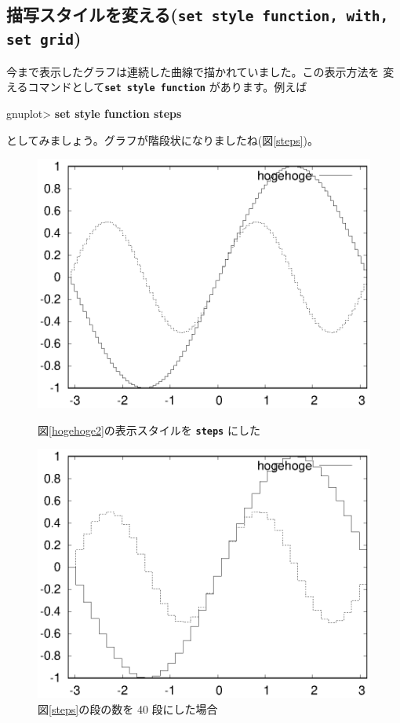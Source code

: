 \documentclass[a4j]{ujarticle} %
\newenvironment{terminal}{%
  \begin{center}
   \begin{minipage}{.8\textwidth}
    \setlength{\FrameSep}{.5\FrameSep}%
    \begin{framed}\ttfamily\small%
     \setlength\baselineskip{.85\baselineskip}%
}{%
    \end{framed}
   \end{minipage}
  \end{center}%
}
\begin{document}
\subsection{描写スタイルを変える({\tt\bf set style function, with, set grid})}
今まで表示したグラフは連続した曲線で描かれていました。この表示方法を
変えるコマンドとして{\tt\bf set style function} があります。例えば
\begin{terminal}
gnuplot> {\bf set style function steps}
\end{terminal}
としてみましょう。グラフが階段状になりましたね(図\ref{steps})。

\begin{figure}
\begin{minipage}[hbtp]{0.49\textwidth}
\includegraphics[width=\hsize]{steps.eps}
\caption{図\ref{hogehoge2}の表示スタイルを {\tt\bf steps} にした}
\label{steps}
\end{minipage}
\begin{minipage}[hbtp]{0.49\textwidth}
\includegraphics[width=\hsize]{steps40.eps}
\caption{図\ref{steps}の段の数を 40 段にした場合}
\label{steps40}
\end{minipage}
\end{figure}
\end{document}

